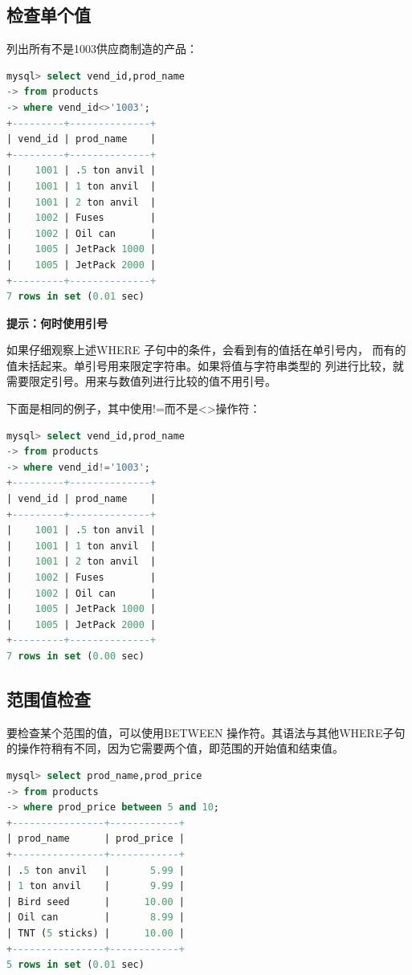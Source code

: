 \documentclass[11pt,a4paper,oneside]{book}
\begin{document}
\subsection{检查单个值}
列出所有不是1003供应商制造的产品：
\begin{lstlisting}[language=sql]
mysql> select vend_id,prod_name
-> from products
-> where vend_id<>'1003';
+---------+--------------+
| vend_id | prod_name    |
+---------+--------------+
|    1001 | .5 ton anvil |
|    1001 | 1 ton anvil  |
|    1001 | 2 ton anvil  |
|    1002 | Fuses        |
|    1002 | Oil can      |
|    1005 | JetPack 1000 |
|    1005 | JetPack 2000 |
+---------+--------------+
7 rows in set (0.01 sec)
\end{lstlisting}
\begin{tcolorbox}[colback=pink!10!white,colframe=pink!100!black]
\textbf{提示：何时使用引号}

如果仔细观察上述WHERE 子句中的条件，会看到有的值括在单引号内，
而有的值未括起来。单引号用来限定字符串。如果将值与字符串类型的
列进行比较，就需要限定引号。用来与数值列进行比较的值不用引号。
\end{tcolorbox}
下面是相同的例子，其中使用!=而不是<>操作符：
\begin{lstlisting}[language=sql]
mysql> select vend_id,prod_name
-> from products
-> where vend_id!='1003';
+---------+--------------+
| vend_id | prod_name    |
+---------+--------------+
|    1001 | .5 ton anvil |
|    1001 | 1 ton anvil  |
|    1001 | 2 ton anvil  |
|    1002 | Fuses        |
|    1002 | Oil can      |
|    1005 | JetPack 1000 |
|    1005 | JetPack 2000 |
+---------+--------------+
7 rows in set (0.00 sec)
\end{lstlisting}

\subsection{范围值检查}
要检查某个范围的值，可以使用BETWEEN 操作符。其语法与其他WHERE子句的操作符稍有不同，因为它需要两个值，即范围的开始值和结束值。
\begin{lstlisting}[language=sql]
mysql> select prod_name,prod_price
-> from products
-> where prod_price between 5 and 10;
+----------------+------------+
| prod_name      | prod_price |
+----------------+------------+
| .5 ton anvil   |       5.99 |
| 1 ton anvil    |       9.99 |
| Bird seed      |      10.00 |
| Oil can        |       8.99 |
| TNT (5 sticks) |      10.00 |
+----------------+------------+
5 rows in set (0.01 sec)
\end{lstlisting}
\end{document}
